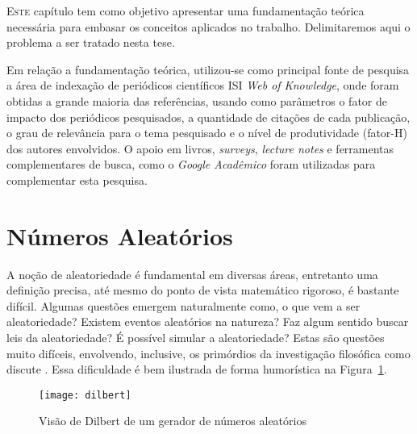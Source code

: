 
\lettrine{E}{ste} capítulo tem como objetivo apresentar uma fundamentação teórica necessária para embasar os conceitos aplicados no trabalho.
Delimitaremos aqui o problema a ser tratado nesta tese.

Em relação a fundamentação teórica, utilizou-se como principal fonte de pesquisa a área de indexação de periódicos científicos ISI \emph{Web of Knowledge}, onde foram obtidas a grande maioria das referências, usando como parâmetros o fator de impacto dos periódicos pesquisados, a quantidade de citações de cada publicação, o grau de relevância para o tema pesquisado e o nível de produtividade (fator-H) dos autores envolvidos. 
O apoio em livros, \textit{surveys}, \textit{lecture notes} e ferramentas complementares de busca, como o \emph{Google Acadêmico} foram utilizadas para complementar esta pesquisa.

\section{Números Aleatórios} %

A noção de aleatoriedade é fundamental em diversas áreas, entretanto uma definição precisa, até mesmo do ponto de vista matemático rigoroso, é bastante difícil. 
Algumas questões emergem naturalmente como, o que vem a ser aleatoriedade? 
Existem eventos aleatórios na natureza? 
Faz algum sentido buscar leis da aleatoriedade? 
É possível simular a aleatoriedade? 
Estas são questões muito difíceis, envolvendo, inclusive, os primórdios da investigação filosófica como discute \citep{Volchan:02}.
Essa dificuldade é bem ilustrada de forma humorística na Figura~\ref{fig:Dilbert}.

\begin{figure}[hbt]
\centering
\texttt{[image: dilbert]}
\caption{Visão de Dilbert de um gerador de números aleatórios}\label{fig:Dilbert}
\end{figure}

